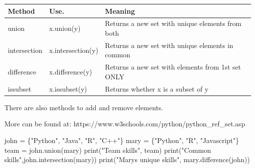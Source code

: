 \documentclass[
  letterpaper,
]{scrbook}
\newenvironment{Shaded}{\begin{snugshade}}{\end{snugshade}}
\newcommand{\BuiltInTok}[1]{\textcolor[rgb]{0.00,0.23,0.31}{#1}}
\newcommand{\NormalTok}[1]{\textcolor[rgb]{0.00,0.23,0.31}{#1}}
\newcommand{\OperatorTok}[1]{\textcolor[rgb]{0.37,0.37,0.37}{#1}}
\newcommand{\StringTok}[1]{\textcolor[rgb]{0.13,0.47,0.30}{#1}}
\newcounter{none} %
\begin{document}
{\def\LTcaptype{none} %
\begin{longtable}[]{@{}
  >{\raggedright\arraybackslash}p{}
  >{\raggedright\arraybackslash}p{}
  >{\raggedright\arraybackslash}p{}@{}}
\toprule\noalign{}
\begin{minipage}[b]{\linewidth}\raggedright
Method
\end{minipage} & \begin{minipage}[b]{\linewidth}\raggedright
Use.
\end{minipage} & \begin{minipage}[b]{\linewidth}\raggedright
Meaning
\end{minipage} \\
\midrule\noalign{}
\endhead
\bottomrule\noalign{}
\endlastfoot
union & x.union(y) & Returns a new set with unique elements from both \\
intersection & x.intersection(y) & Returns a new set with unique
elements in common \\
difference & x.difference(y) & Returns a new set with elements from 1st
set ONLY \\
issubset & x.issubset(y) & Returns whether x is a subset of y \\
\end{longtable}
}

There are also methods to add and remove elements.

More can be found at:
https://www.w3schools.com/python/python\_ref\_set.asp

\begin{Shaded}
\begin{Highlighting}[]
\NormalTok{john }\OperatorTok{=}\NormalTok{ \{}\StringTok{"Python"}\NormalTok{, }\StringTok{"Java"}\NormalTok{, }\StringTok{"R"}\NormalTok{, }\StringTok{"C++"}\NormalTok{\}}
\NormalTok{mary }\OperatorTok{=}\NormalTok{ \{}\StringTok{"Python"}\NormalTok{, }\StringTok{"R"}\NormalTok{, }\StringTok{"Javascript"}\NormalTok{\}}
\NormalTok{team }\OperatorTok{=}\NormalTok{ john.union(mary)}
\BuiltInTok{print}\NormalTok{(}\StringTok{"Team skills"}\NormalTok{, team)}
\BuiltInTok{print}\NormalTok{(}\StringTok{"Common skills"}\NormalTok{,john.intersection(mary))}
\BuiltInTok{print}\NormalTok{(}\StringTok{"Mary\textquotesingle{}s unique skills"}\NormalTok{, mary.difference(john))}
\end{Highlighting}
\end{Shaded}
\end{document}
